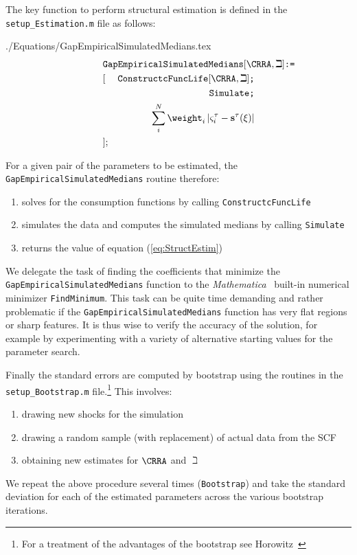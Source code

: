 \documentclass[titlepage]{\econtex}
\newcommand{\Mma}{\textit{Mathematica}}
\begin{document}
  The key function to perform structural estimation is defined in the \texttt{setup\_Estimation.m} file as follows:
  \begin{verbatimwrite}{./Equations/GapEmpiricalSimulatedMedians.tex}
    \begin{eqnarray}
      \lefteqn{    \texttt{GapEmpiricalSimulatedMedians$[\CRRA,\beth]$:=}} & &  \nonumber \\
                                                                           &[&\texttt{ConstructcFuncLife$[\CRRA,\beth]$;}\nonumber\\
                                                                           &&\texttt{Simulate;}\nonumber\\
                                                                           &&\sum\limits_{i}^{N}\weight _{i}\left|\varsigma_{i}^{\tau }-\mathbf{s}^{\tau}(\xi )\right| \nonumber\\
                                                                           &];&\nonumber
    \end{eqnarray}
  \end{verbatimwrite}
  
  For a given pair of the parameters to be estimated, the \texttt{GapEmpiricalSimulatedMedians} routine therefore:
  \begin{enumerate}
  \item solves for the consumption functions by calling \texttt{ConstructcFuncLife}
  \item simulates the data and computes the simulated medians by calling \texttt{Simulate}
  \item returns the value of equation (\ref{eq:StructEstim})
  \end{enumerate}

  We delegate the task of finding the coefficients that minimize the
  \texttt{GapEmpiricalSimulatedMedians} function to the \Mma~
  built-in numerical minimizer \texttt{FindMinimum}.  This task can be
  quite time demanding and rather problematic if the
  \texttt{GapEmpiricalSimulatedMedians} function has very flat regions
  or sharp features. It is thus wise to verify the accuracy of the
  solution, for example by experimenting with a variety of alternative starting values for the
  parameter search.

  Finally the standard errors are computed by bootstrap using the
  routines in the \texttt{setup\_Bootstrap.m} file.\footnote{For a
    treatment of the advantages of the bootstrap see
    Horowitz~\citeyearpar{horowitzBootstrap}} This involves:
  \begin{enumerate}
  \item drawing new shocks for the simulation
  \item drawing a random sample (with replacement) of actual data from the SCF
  \item obtaining new estimates for $\CRRA$ and ${\beth}$
  \end{enumerate}
  We repeat the above procedure several times (\texttt{Bootstrap}) and take the standard deviation for each of the estimated parameters across the various bootstrap iterations.
\end{document}
